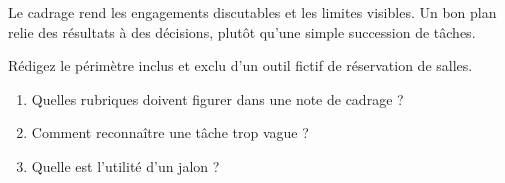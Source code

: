 \documentclass[12pt,twoside]{upbcours}
\begin{document}
\begin{resumechapitre}
  Le cadrage rend les engagements discutables et les limites visibles. Un bon plan relie des
  résultats à des décisions, plutôt qu'une simple succession de tâches.
\end{resumechapitre}
\begin{evalformative}
  Rédigez le périmètre inclus et exclu d'un outil fictif de réservation de salles.
\end{evalformative}
\begin{autoevaluation}
  \begin{enumerate}
    \item Quelles rubriques doivent figurer dans une note de cadrage ?
    \item Comment reconnaître une tâche trop vague ?
    \item Quelle est l'utilité d'un jalon ?
  \end{enumerate}
\end{autoevaluation}
\end{document}
